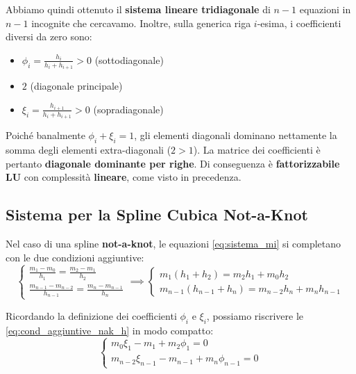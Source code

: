 Abbiamo quindi ottenuto il \textbf{sistema lineare tridiagonale} di $n-1$ equazioni in $n-1$ incognite che cercavamo. 
Inoltre, sulla generica riga $i$-esima, i coefficienti diversi da zero sono:
\begin{itemize}
    \item $\phi_i = \frac{h_i}{h_i+h_{i+1}} > 0$ (sottodiagonale)
    \item $2$ (diagonale principale)
    \item $\xi_i = \frac{h_{i+1}}{h_i+h_{i+1}} > 0$ (sopradiagonale)
\end{itemize}

Poiché banalmente $\phi_i + \xi_i = 1$, gli elementi diagonali dominano nettamente la somma degli elementi extra-diagonali ($2 > 1$). La matrice dei coefficienti è pertanto \textbf{diagonale dominante per righe}.
Di conseguenza è \textbf{fattorizzabile LU} con complessità \textbf{lineare}, come visto in precedenza.















\vspace{0.6cm}
\subsection*{Sistema per la Spline Cubica Not-a-Knot}

Nel caso di una spline \textbf{not-a-knot}, le equazioni \eqref{eq:sistema_mi} si completano con le due condizioni aggiuntive:
\begin{equation} \label{eq:cond_aggiuntive_nak_h}
\begin{cases}
\frac{m_1 - m_0}{h_1} = \frac{m_2 - m_1}{h_2} \\[2ex]
\frac{m_{n-1} - m_{n-2}}{h_{n-1}} = \frac{m_n - m_{n-1}}{h_n}
\end{cases}
\implies
\begin{cases}
m_1(h_1 + h_2) = m_2 h_1 + m_0 h_2 \\
m_{n-1}(h_{n-1} + h_n) = m_{n-2} h_n + m_n h_{n-1}
\end{cases}
\end{equation}

Ricordando la definizione dei coefficienti $\phi_i$ e $\xi_i$, possiamo riscrivere le \eqref{eq:cond_aggiuntive_nak_h} in modo compatto:
\begin{equation} \label{eq:cond_aggiuntive_nak_compatte}
\begin{cases}
m_0 \xi_1 - m_1 + m_2 \phi_1 = 0 \\
m_{n-2} \xi_{n-1} - m_{n-1} + m_n \phi_{n-1} = 0
\end{cases}
\end{equation}

